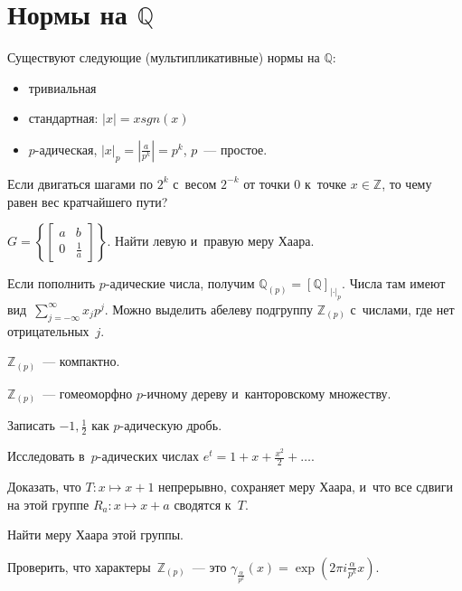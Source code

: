 \documentclass{article}
\begin{document}
\section{Нормы на $\mathbb{Q}$}

\begin{theorem}
	Существуют следующие (мультипликативные) нормы на $\mathbb{Q}$:
	\begin{itemize}
		\item тривиальная
		\item стандартная: $|x| = x sgn(x)$
		\item $p$-адическая, $|x|_p = |\frac{a}{p^k}| = p^k$, $p$~--- простое.
	\end{itemize}
\end{theorem}

\begin{exercise}
	Если двигаться шагами по $2^k$ с~весом $2^{-k}$ от точки 0 к~точке $x \in
	\mathbb{Z}$, то чему равен вес кратчайшего пути?
\end{exercise}

\begin{exercise}
	$G = \left\{ \begin{bmatrix}a & b\\0 & \frac{1}{a}\end{bmatrix} \right\}$.
	Найти левую и~правую меру Хаара.
\end{exercise}

Если пополнить $p$-адические числа, получим $\mathbb{Q}_{(p)} =
[\mathbb{Q}]_{|\cdot|_p}$. Числа там имеют вид~$\sum\limits_{j=-\infty}^{\infty}
x_j p^j$. Можно выделить абелеву подгруппу $\mathbb{Z}_{(p)}$ с~числами, где нет
отрицательных~$j$.

\begin{exercise}
	$\mathbb{Z}_{(p)}$~--- компактно.
\end{exercise}

\begin{exercise}
	$\mathbb{Z}_{(p)}$~--- гомеоморфно $p$-ичному дереву и~канторовскому множеству.
\end{exercise}

\begin{exercise}
	Записать $-1, \frac{1}{2}$ как $p$-адическую дробь.
\end{exercise}

\begin{exercise}[$\ast\ast$]
	Исследовать в~$p$-адических числах $e^t = 1 + x + \frac{x^2}{2} + \ldots$.
\end{exercise}

\begin{exercise}
	Доказать, что $T: x \mapsto x + 1$ непрерывно, сохраняет меру Хаара, и~что все
	сдвиги на этой группе $R_a: x \mapsto x + a$ сводятся к~$T$.
\end{exercise}

\begin{exercise}
	Найти меру Хаара этой группы.
\end{exercise}

\begin{exercise}
	Проверить, что характеры~$\mathbb{Z}_{(p)}$~--- это
	$\gamma_{\frac{\alpha}{p^k}}(x) = \exp(2\pi i \frac{\alpha}{p^k}x)$.
\end{exercise}
\end{document}

